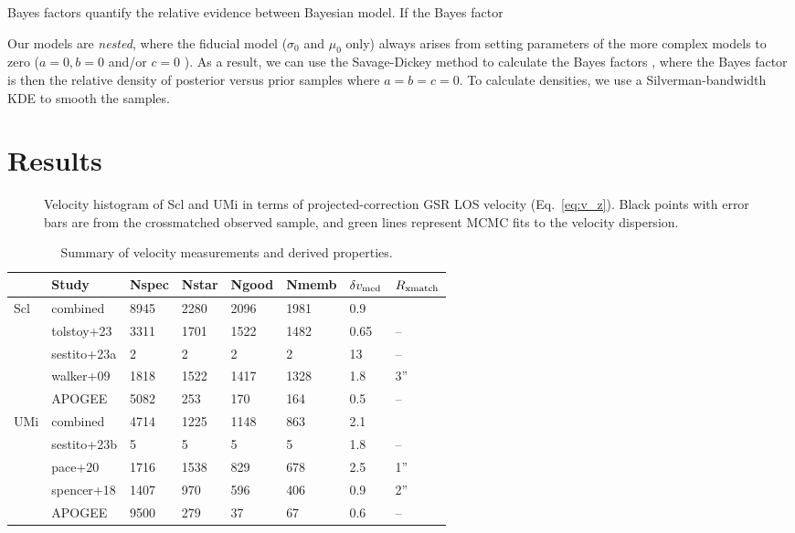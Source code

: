 Bayes factors quantify the relative evidence between Bayesian model. If
the Bayes factor

Our models are \emph{nested}, where the fiducial model (\(\sigma_0\) and
\(\mu_0\) only) always arises from setting parameters of the more
complex models to zero (\(a=0, b=0\) and/or \(c=0\) ). As a result, we
can use the Savage-Dickey method to calculate the Bayes factors
\citep{dickey+lientz1970}, where the Bayes factor is then the relative
density of posterior versus prior samples where \(a=b=c=0\). To
calculate densities, we use a Silverman-bandwidth KDE to smooth the
samples.

\section{Results}\label{sec:rv_results}

\begin{figure}
\centering
{}
\caption[LOS velocity fit to Scl]{Velocity histogram of Scl and UMi in
terms of projected-correction GSR LOS velocity (Eq.~\ref{eq:v_z}). Black
points with error bars are from the crossmatched observed sample, and
green lines represent MCMC fits to the velocity dispersion.}
\end{figure}

\begin{table*}[t]
\centering
\caption[Spectroscopic LOS velocity measurements]{Summary of velocity measurements and derived properties. }
\label{tbl:rv_measurements}
\begin{tabular}{llllllll}
\toprule
 & Study & Nspec & Nstar & Ngood & Nmemb & $\delta v_{\rm med}$ & $R_{\rm xmatch}$\\
\midrule
Scl & combined & 8945 & 2280 & 2096 & 1981 & 0.9 & \\
 & tolstoy+23 & 3311 & 1701 & 1522 & 1482 & 0.65 & –\\
 & sestito+23a & 2 & 2 & 2 & 2 & 13 & –\\
 & walker+09 & 1818 & 1522 & 1417 & 1328 & 1.8 & 3”\\
 & APOGEE & 5082 & 253 & 170 & 164 & 0.5 & –\\
UMi & combined & 4714 & 1225 & 1148 & 863 & 2.1 & \\
 & sestito+23b & 5 & 5 & 5 & 5 & 1.8 & –\\
 & pace+20 & 1716 & 1538 & 829 & 678 & 2.5 & 1”\\
 & spencer+18 & 1407 & 970 & 596 & 406 & 0.9 & 2”\\
 & APOGEE & 9500 & 279 & 37 & 67 & 0.6 & –\\
\bottomrule
\end{tabular}
\end{table*}

